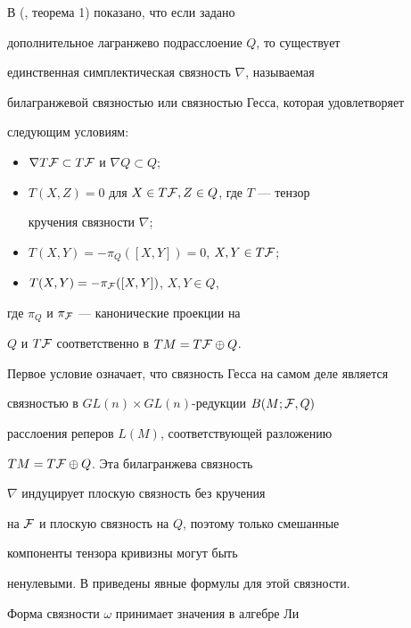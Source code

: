 В (\cite{HE}, теорема 1) показано, что если задано


дополнительное лагранжево подрасслоение $Q$, то существует


единственная симплектическая связность $\nabla$, называемая


билагранжевой связностью или связностью Гесса, которая удовлетворяет


следующим условиям:


\begin{itemize}


\item[1)] $\nabla T{\cal F} \subset T{\cal F}$ и $\nabla Q \subset Q$;


\item[2)] $T(X,Z) = 0$ для $X \in T{\cal F}, Z \in Q$, где $T$ --- тензор


кручения связности $\nabla$;


\item[3)] $T(X,Y) = -{\pi}_Q([X,Y]) = 0$, $X,Y \in T{\cal F}$;


\item[4)] $T(X,Y) = -{\pi}_{\cal F}([X,Y])$, $X,Y \in Q$,


\end{itemize}


где ${\pi}_{Q}$ и ${\pi}_{\cal F}$ --- канонические проекции на


$Q$ и $T{\cal F}$ соответственно в $TM = T{\cal F} \oplus Q$.





Первое условие означает, что связность Гесса на самом деле является


связностью в $GL(n) \times GL(n)$-редукции $B(M; {\cal F}, Q)$


расслоения реперов $L(M)$, соответствующей разложению


$TM = T{\cal F} \oplus Q$. Эта билагранжева связность


$\nabla$ индуцирует плоскую связность без кручения


на $\cal F$ и плоскую связность на $Q$, поэтому только смешанные


компоненты тензора кривизны могут быть


ненулевыми. В \cite{HE} приведены явные формулы для этой связности.





Форма связности $\omega$ принимает значения в алгебре Ли


